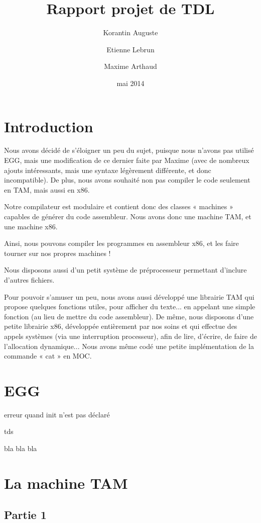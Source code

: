 \documentclass{scrartcl}
\title{Rapport projet de TDL}
\author{Korantin Auguste \and Etienne Lebrun \and Maxime Arthaud}
\date{mai 2014}
\begin{document}
  \maketitle
  \tableofcontents
  \newpage

\section{Introduction}
    Nous avons décidé de s'éloigner un peu du sujet, puisque nous
    n'avons pas utilisé EGG, mais une modification de ce dernier faite
    par Maxime (avec de nombreux ajouts intéressants, mais une syntaxe
    légèrement différente, et donc incompatible).
    De plus, nous avons souhaité non pas compiler le code seulement en TAM,
    mais aussi en x86.

    Notre compilateur est modulaire et contient donc des classes « machines » capables de générer du code
    assembleur. Nous avons donc une machine TAM, et une machine x86.

    Ainsi, nous pouvons compiler les programmes en assembleur x86, et les faire tourner sur nos
    propres machines !

    Nous disposons aussi d'un petit système de préprocesseur permettant d'inclure d'autres fichiers.
    
    Pour pouvoir s'amuser un peu, nous avons aussi développé une librairie TAM qui propose quelques
    fonctions utiles, pour afficher du texte... en appelant une simple fonction (au lieu de mettre
    du code assembleur).
    De même, nous disposons d'une petite librairie x86, développée entièrement par nos soins et qui
    effectue des appels systèmes (via une interruption processeur), afin de lire, d'écrire, de faire
    de l'allocation dynamique... Nous avons même codé une petite implémentation de la commande « cat »
    en MOC.
 
\section{EGG}

erreur quand init n'est pas déclaré

tds 

bla bla bla

\section{La machine TAM}

\subsection{Partie 1}
\end{document}
